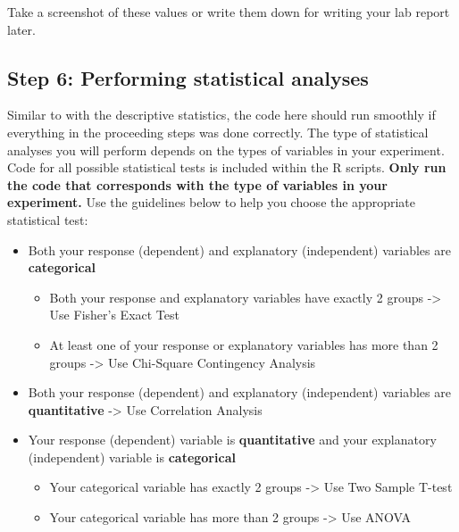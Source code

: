 \documentclass[
]{book}
\providecommand{\tightlist}{%
  \setlength{\itemsep}{0pt}\setlength{\parskip}{0pt}}
\begin{document}
Take a screenshot of these values or write them down for writing your lab report later.

\hypertarget{step-6-performing-statistical-analyses}{%
\subsection*{Step 6: Performing statistical analyses}\label{step-6-performing-statistical-analyses}}

Similar to with the descriptive statistics, the code here should run smoothly if everything in the proceeding steps was done correctly. The type of statistical analyses you will perform depends on the types of variables in your experiment. Code for all possible statistical tests is included within the R scripts. \textbf{Only run the code that corresponds with the type of variables in your experiment.} Use the guidelines below to help you choose the appropriate statistical test:

\begin{itemize}
\tightlist
\item
  Both your response (dependent) and explanatory (independent) variables are \textbf{categorical}

  \begin{itemize}
  \tightlist
  \item
    Both your response and explanatory variables have exactly 2 groups -\textgreater{} Use Fisher's Exact Test
  \item
    At least one of your response or explanatory variables has more than 2 groups -\textgreater{} Use Chi-Square Contingency Analysis
  \end{itemize}
\item
  Both your response (dependent) and explanatory (independent) variables are \textbf{quantitative} -\textgreater{} Use Correlation Analysis
\item
  Your response (dependent) variable is \textbf{quantitative} and your explanatory (independent) variable is \textbf{categorical}

  \begin{itemize}
  \tightlist
  \item
    Your categorical variable has exactly 2 groups -\textgreater{} Use Two Sample T-test
  \item
    Your categorical variable has more than 2 groups -\textgreater{} Use ANOVA
  \end{itemize}
\end{itemize}
\end{document}
